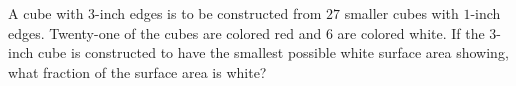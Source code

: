 A cube with $3$-inch edges is to be constructed from $27$ smaller cubes with $1$-inch edges. Twenty-one of the cubes are colored red and $6$ are colored white. If the $3$-inch cube is constructed to have the smallest possible white surface area showing, what fraction of the surface area is white?

